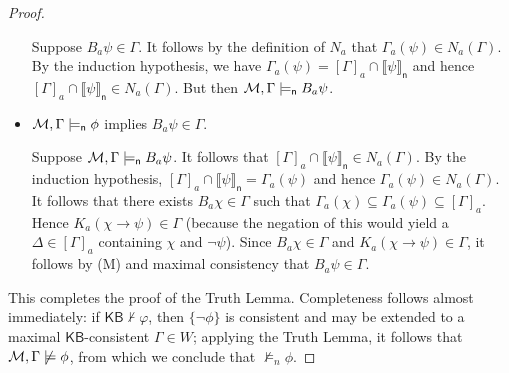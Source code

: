 \documentclass[12pt]{article}
\theoremstyle{definition}
\newcommand{\M}{{\cal M}}      %
\newcommand{\KB}{{\mathsf{KB}}}                     %
\newcommand{\modelsn}{\models_{\mathsf{n}}}                  %
\newcommand{\semn}[1]{\llbracket{#1}\rrbracket_{\mathsf{n}}} %
\begin{document}
\begin{proof}
\begin{itemize}
    Suppose $B_a\psi\in\Gamma$.  It follows by the definition of $N_a$
    that $\Gamma_a(\psi)\in N_a(\Gamma)$.  By the induction
    hypothesis, we have $\Gamma_a(\psi)=[\Gamma]_a\cap \semn{\psi}$
    and hence $[\Gamma]_a\cap\semn{\psi}\in N_a(\Gamma)$.  But then
    $\M,\Gamma\modelsn B_a\psi$.

  \item $\M,\Gamma\modelsn\phi$ implies $B_a\psi\in\Gamma$.

    Suppose $\M,\Gamma\modelsn B_a\psi$.  It follows that
    $[\Gamma]_a\cap\semn{\psi}\in N_a(\Gamma)$.  By the induction
    hypothesis, $[\Gamma]_a\cap\semn{\psi}=\Gamma_a(\psi)$ and hence
    $\Gamma_a(\psi)\in N_a(\Gamma)$.  It follows that there exists
    $B_a\chi\in\Gamma$ such that
    $\Gamma_a(\chi)\subseteq\Gamma_a(\psi)\subseteq[\Gamma]_a$.  Hence
    $K_a(\chi\to\psi)\in\Gamma$ (because the negation of this would
    yield a $\Delta\in[\Gamma]_a$ containing $\chi$ and $\lnot\psi$).
    Since $B_a\chi\in\Gamma$ and $K_a(\chi\to\psi)\in\Gamma$, it
    follows by (M) and maximal consistency that $B_a\psi\in\Gamma$.
  \end{itemize}
  This completes the proof of the Truth Lemma.  Completeness follows
  almost immediately: if $\KB\nvdash\varphi$, then $\{\lnot\phi\}$ is
  consistent and may be extended to a maximal $\KB$-consistent
  $\Gamma\in W$; applying the Truth Lemma, it follows that
  $\M,\Gamma\not\models\phi$, from which we conclude that
  $\not\models_n\phi$.


\end{proof}
\end{document}
